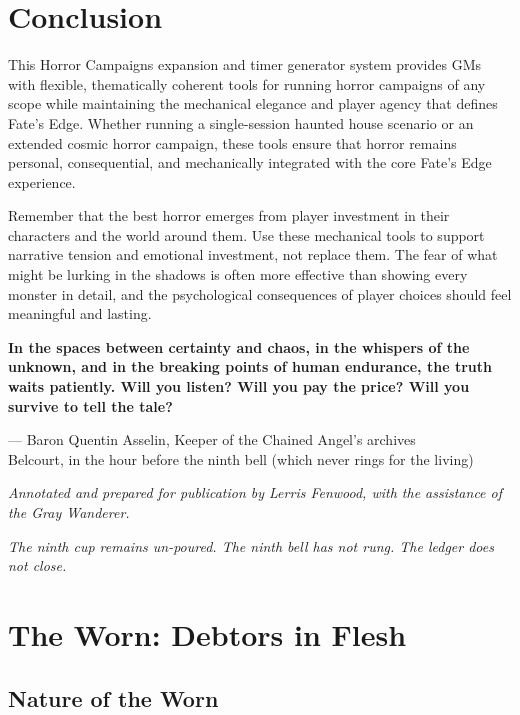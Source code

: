 \documentclass[11pt]{article}
\begin{document}
\section{Conclusion}

This Horror Campaigns expansion and timer generator system provides GMs with flexible, thematically coherent tools for running horror campaigns of any scope while maintaining the mechanical elegance and player agency that defines Fate's Edge. Whether running a single-session haunted house scenario or an extended cosmic horror campaign, these tools ensure that horror remains personal, consequential, and mechanically integrated with the core Fate's Edge experience.

Remember that the best horror emerges from player investment in their characters and the world around them. Use these mechanical tools to support narrative tension and emotional investment, not replace them. The fear of what might be lurking in the shadows is often more effective than showing every monster in detail, and the psychological consequences of player choices should feel meaningful and lasting.

\begin{center}
\textbf{In the spaces between certainty and chaos, in the whispers of the unknown, and in the breaking points of human endurance, the truth waits patiently. Will you listen? Will you pay the price? Will you survive to tell the tale?}
\end{center}

\vspace{1cm}
\noindent
--- Baron Quentin Asselin, Keeper of the Chained Angel's archives\\
Belcourt, in the hour before the ninth bell (which never rings for the living)

\vspace{0.5cm}
\noindent
\textit{Annotated and prepared for publication by Lerris Fenwood, with the assistance of the Gray Wanderer.}

\noindent
\textit{The ninth cup remains un-poured. The ninth bell has not rung. The ledger does not close.}

\section{The Worn: Debtors in Flesh}

\subsection{Nature of the Worn}
\end{document}
